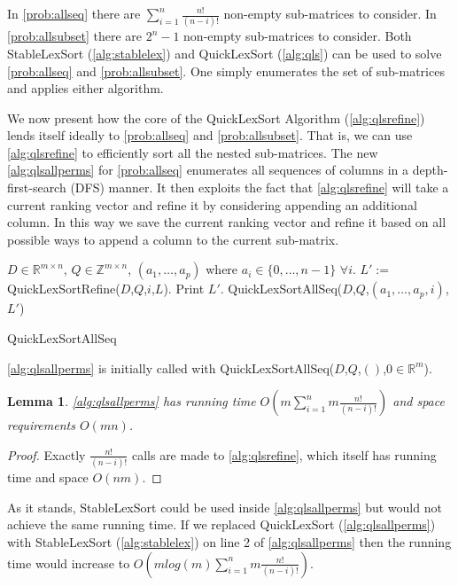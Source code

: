 \documentclass[a4paper,10pt,reqno]{amsart}
\newcommand\Z{\mathbb Z}
\newcommand\R{\mathbb R}
\newtheorem{lemma}{Lemma}
\theoremstyle{definition}
\begin{document}
In \autoref{prob:allseq} there are $\sum_{i=1}^n \frac{n!}{(n-i)!}$ non-empty
sub-matrices to consider.  In \autoref{prob:allsubset} there are $2^n -1 $
non-empty sub-matrices to consider. Both StableLexSort (\autoref{alg:stablelex})
and QuickLexSort (\autoref{alg:qls}) can be used to solve \autoref{prob:allseq}
and \autoref{prob:allsubset}. One simply enumerates the set of sub-matrices and
applies either algorithm.

We now present how the core of the QuickLexSort Algorithm
(\autoref{alg:qlsrefine}) lends itself ideally to \autoref{prob:allseq} and
\autoref{prob:allsubset}. That is, we can use \autoref{alg:qlsrefine} to
efficiently sort all the nested sub-matrices. The new \autoref{alg:qlsallperms}
for \autoref{prob:allseq} enumerates all sequences of columns in a
depth-first-search (DFS) manner.  It then exploits the fact that
\autoref{alg:qlsrefine} will take a current ranking vector and refine it by
considering appending an additional column. In this way we save the current
ranking vector and refine it based on all possible ways to append a column to
the current sub-matrix. 

\begin{algorithm}
\begin{algorithmic}[1]
    \REQUIRE $D \in \R^{m\times n}$, $Q \in \Z^{m\times n}$, $(a_1,\ldots,a_p)$ where $ a_i \in \{0,\ldots,n-1\}$ $\forall i$.
        \STATE $L' := $QuickLexSortRefine($D$,$Q$,$i$,$L$).
        \STATE Print $L'$.
        \STATE QuickLexSortAllSeq($D$,$Q$,$(a_1,\ldots,a_p,i)$,$L'$)
    \ENDFOR
\end{algorithmic}
\caption{QuickLexSortAllSeq}
\label{alg:qlsallperms}
\end{algorithm}

\autoref{alg:qlsallperms} is initially called with QuickLexSortAllSeq($D$,$Q$,$()$,$0\in \R^m$).

\begin{lemma}
    \autoref{alg:qlsallperms} has running time $O\left(m \sum_{i=1}^n m \frac{n!}{(n-i)!}\right)$ and space requirements $O(mn)$.
\end{lemma}
\begin{proof}
    Exactly $\frac{n!}{(n-i)!}$ calls are made to \autoref{alg:qlsrefine}, which itself has running time and space $O(nm)$.
\end{proof}

As it stands, StableLexSort could be used  
inside \autoref{alg:qlsallperms} but would not achieve the same running time.
If we replaced QuickLexSort (\autoref{alg:qlsallperms}) with StableLexSort (\autoref{alg:stablelex}) on
line 2 of \autoref{alg:qlsallperms} then the running time would
increase to $O\left(m log(m) \sum_{i=1}^n m \frac{n!}{(n-i)!}\right)$.
\end{document}
